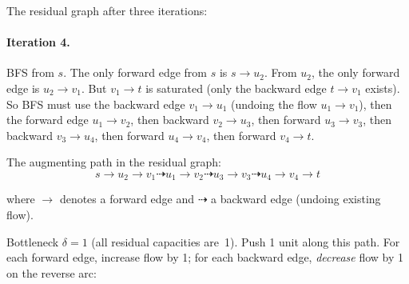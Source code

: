 \documentclass[11pt]{article}
\begin{document}
The residual graph after three iterations:

\begin{center}
\end{center}

\paragraph{Iteration 4.}
BFS from $s$.  The only forward edge from $s$ is $s \to u_2$.
From $u_2$, the only forward edge is $u_2 \to v_1$.  But
$v_1 \to t$ is saturated (only the backward edge $t \to v_1$
exists).  So BFS must use the backward edge $v_1 \to u_1$
(undoing the flow $u_1 \to v_1$), then the forward edge
$u_1 \to v_2$, then backward $v_2 \to u_3$, then forward
$u_3 \to v_3$, then backward $v_3 \to u_4$, then forward
$u_4 \to v_4$, then forward $v_4 \to t$.

The augmenting path in the residual graph:
\[
  s \to u_2 \to v_1
  \dashrightarrow u_1 \to v_2
  \dashrightarrow u_3 \to v_3
  \dashrightarrow u_4 \to v_4 \to t
\]

\noindent
where $\to$ denotes a forward edge and $\dashrightarrow$ a
backward edge (undoing existing flow).

Bottleneck $\delta = 1$ (all residual capacities are~1).  Push
1 unit along this path.  For each forward edge, increase flow by
1; for each backward edge, \emph{decrease} flow by 1 on the
reverse arc:
\end{document}
